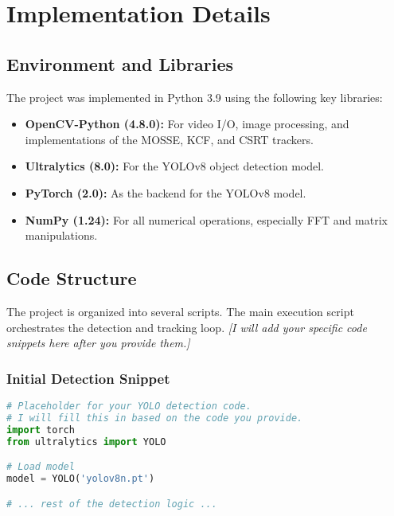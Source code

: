 \documentclass[12pt, a4paper]{report}
\begin{document}

\chapter{Implementation Details}

\section{Environment and Libraries}
The project was implemented in Python 3.9 using the following key libraries:
\begin{itemize}
    \item \textbf{OpenCV-Python (4.8.0):} For video I/O, image processing, and implementations of the MOSSE, KCF, and CSRT trackers.
    \item \textbf{Ultralytics (8.0):} For the YOLOv8 object detection model.
    \item \textbf{PyTorch (2.0):} As the backend for the YOLOv8 model.
    \item \textbf{NumPy (1.24):} For all numerical operations, especially FFT and matrix manipulations.
\end{itemize}

\section{Code Structure}
The project is organized into several scripts. The main execution script orchestrates the detection and tracking loop.
\textit{[I will add your specific code snippets here after you provide them.]}

\subsection{Initial Detection Snippet}
\begin{lstlisting}[language=Python, caption={Code for initializing YOLO and detecting the first object.}]
# Placeholder for your YOLO detection code.
# I will fill this in based on the code you provide.
import torch
from ultralytics import YOLO

# Load model
model = YOLO('yolov8n.pt') 

# ... rest of the detection logic ...
\end{lstlisting}
\end{document}
